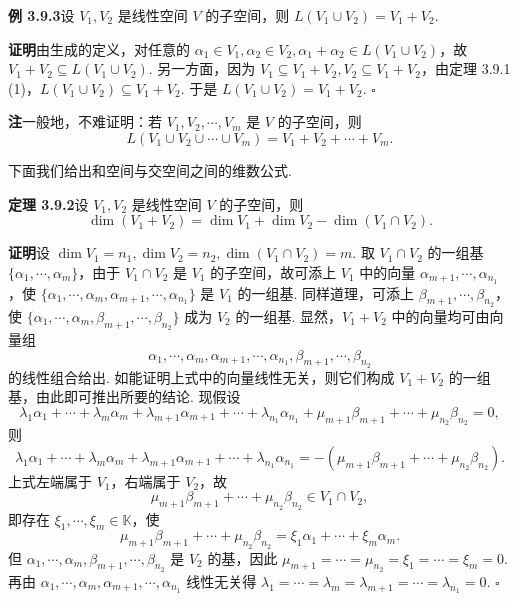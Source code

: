 \documentclass[UTF8, 12pt, fontset=fandol, oneside]{ctexart}
\begin{document}
\noindent\textbf{例 3.9.3}\quad 设 $V_1,V_2$ 是线性空间 $V$ 的子空间，则 $L(V_1\cup V_2)=V_1+V_2$.

\noindent\textbf{证明}\quad 由生成的定义，对任意的 $\alpha_1\in V_1,\alpha_2\in V_2,\alpha_1+\alpha_2\in L(V_1\cup V_2)$，故 $V_1+V_2\subseteq L(V_1\cup V_2)$. 另一方面，因为 $V_1\subseteq V_1+V_2,V_2\subseteq V_1+V_2$，由定理 3.9.1 (1)，$L(V_1\cup V_2)\subseteq V_1+V_2$. 于是 $L(V_1\cup V_2)=V_1+V_2$. $\square$

\noindent\textbf{注}\quad 一般地，不难证明：若 $V_1,V_2,\cdots,V_m$ 是 $V$ 的子空间，则
\[
L(V_1\cup V_2\cup\cdots\cup V_m)=V_1+V_2+\cdots+V_m.
\]

下面我们给出和空间与交空间之间的维数公式.

\noindent\textbf{定理 3.9.2}\quad 设 $V_1,V_2$ 是线性空间 $V$ 的子空间，则
\begin{equation}
\dim(V_1+V_2)=\dim V_1+\dim V_2-\dim(V_1\cap V_2).
\tag{3.9.1}
\end{equation}

\noindent\textbf{证明}\quad 设 $\dim V_1=n_1,\dim V_2=n_2,\dim(V_1\cap V_2)=m$. 取 $V_1\cap V_2$ 的一组基 $\{\alpha_1,\cdots,\alpha_m\}$，由于 $V_1\cap V_2$ 是 $V_1$ 的子空间，故可添上 $V_1$ 中的向量 $\alpha_{m+1},\cdots,\alpha_{n_1}$，使 $\{\alpha_1,\cdots,\alpha_m,\alpha_{m+1},\cdots,\alpha_{n_1}\}$ 是 $V_1$ 的一组基. 同样道理，可添上 $\beta_{m+1},\cdots,\beta_{n_2}$，使 $\{\alpha_1,\cdots,\alpha_m,\beta_{m+1},\cdots,\beta_{n_2}\}$ 成为 $V_2$ 的一组基. 显然，$V_1+V_2$ 中的向量均可由向量组
\begin{equation}
\alpha_1,\cdots,\alpha_m,\alpha_{m+1},\cdots,\alpha_{n_1},\beta_{m+1},\cdots,\beta_{n_2}
\tag{3.9.2}
\end{equation}
的线性组合给出. 如能证明上式中的向量线性无关，则它们构成 $V_1+V_2$ 的一组基，由此即可推出所要的结论. 现假设
\[
\lambda_1\alpha_1+\cdots+\lambda_m\alpha_m+\lambda_{m+1}\alpha_{m+1}+\cdots+\lambda_{n_1}\alpha_{n_1}+\mu_{m+1}\beta_{m+1}+\cdots+\mu_{n_2}\beta_{n_2}=0,
\]
则
\[
\lambda_1\alpha_1+\cdots+\lambda_m\alpha_m+\lambda_{m+1}\alpha_{m+1}+\cdots+\lambda_{n_1}\alpha_{n_1}=-(\mu_{m+1}\beta_{m+1}+\cdots+\mu_{n_2}\beta_{n_2}).
\]
上式左端属于 $V_1$，右端属于 $V_2$，故
\[
\mu_{m+1}\beta_{m+1}+\cdots+\mu_{n_2}\beta_{n_2}\in V_1\cap V_2,
\]
即存在 $\xi_1,\cdots,\xi_m\in\mathbb{K}$，使
\[
\mu_{m+1}\beta_{m+1}+\cdots+\mu_{n_2}\beta_{n_2}=\xi_1\alpha_1+\cdots+\xi_m\alpha_m.
\]
但 $\alpha_1,\cdots,\alpha_m,\beta_{m+1},\cdots,\beta_{n_2}$ 是 $V_2$ 的基，因此 $\mu_{m+1}=\cdots=\mu_{n_2}=\xi_1=\cdots=\xi_m=0$. 再由 $\alpha_1,\cdots,\alpha_m,\alpha_{m+1},\cdots,\alpha_{n_1}$ 线性无关得 $\lambda_1=\cdots=\lambda_m=\lambda_{m+1}=\cdots=\lambda_{n_1}=0$. $\square$
\end{document}
